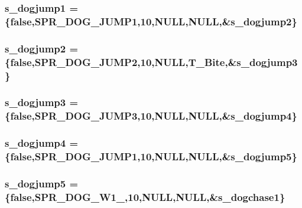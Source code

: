 \label{WL__ACT2_8C_a8fdecc366ad38c39f6150272f4f80ee7}
\hypertarget{WL__ACT2_8C_afc318b0d900021e2166f94900d665c0a}{
\subsubsection[{s\_\-dogjump1}]{ {\bf s\_\-dogjump1} = \{false,SPR\_\-DOG\_\-JUMP1,10,NULL,NULL,\&{\bf s\_\-dogjump2}\}}}
\label{WL__ACT2_8C_afc318b0d900021e2166f94900d665c0a}
\hypertarget{WL__ACT2_8C_a8d953ba0abbbc775086560c64c62ba38}{
\subsubsection[{s\_\-dogjump2}]{ {\bf s\_\-dogjump2} = \{false,SPR\_\-DOG\_\-JUMP2,10,NULL,T\_\-Bite,\&{\bf s\_\-dogjump3}\}}}
\label{WL__ACT2_8C_a8d953ba0abbbc775086560c64c62ba38}
\hypertarget{WL__ACT2_8C_a6820b94974ae76b9a6e1ffa7f34dd61d}{
\subsubsection[{s\_\-dogjump3}]{ {\bf s\_\-dogjump3} = \{false,SPR\_\-DOG\_\-JUMP3,10,NULL,NULL,\&{\bf s\_\-dogjump4}\}}}
\label{WL__ACT2_8C_a6820b94974ae76b9a6e1ffa7f34dd61d}
\hypertarget{WL__ACT2_8C_a9efbbafd02f33c3221db430f51d109c2}{
\subsubsection[{s\_\-dogjump4}]{ {\bf s\_\-dogjump4} = \{false,SPR\_\-DOG\_\-JUMP1,10,NULL,NULL,\&{\bf s\_\-dogjump5}\}}}
\label{WL__ACT2_8C_a9efbbafd02f33c3221db430f51d109c2}
\hypertarget{WL__ACT2_8C_a13801465629bd18b57ad2d9bfa6b8fab}{
\subsubsection[{s\_\-dogjump5}]{ {\bf s\_\-dogjump5} = \{false,SPR\_\-DOG\_\-W1\_,10,NULL,NULL,\&{\bf s\_\-dogchase1}\}}}
